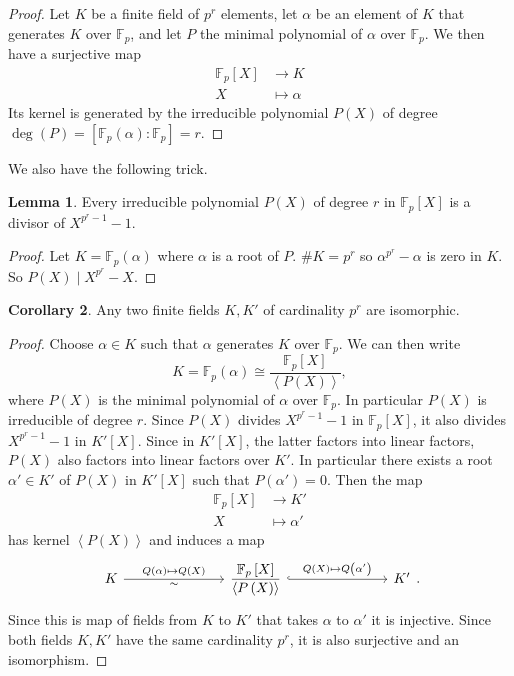 \documentclass{article}
\newcommand{\F}{\mathbb{F}}
\newcommand{\rb}[1]{\left( #1 \right)}
\renewcommand{\sb}[1]{\left[ #1 \right]}
\newcommand{\ab}[1]{\left\langle #1 \right\rangle}
\theoremstyle{definition}\newtheorem{definition}{Definition}[subsection]
\theoremstyle{definition}\newtheorem{remark}[definition]{Remark}
\theoremstyle{definition}\newtheorem*{example}{Example}
\theoremstyle{definition}\newtheorem*{note}{Note}
\newtheorem{lemma}[definition]{Lemma}
\newtheorem{corollary}[definition]{Corollary}
\begin{document}
\begin{proof}
Let $ K $ be a finite field of $ p^r $ elements, let $ \alpha $ be an element of $ K $ that generates $ K $ over $ \F_p $, and let $ P $ the minimal polynomial of $ \alpha $ over $ \F_p $. We then have a surjective map
\begin{align*}
\F_p\sb{X} & \to K \\
X & \mapsto \alpha
\end{align*}
Its kernel is generated by the irreducible polynomial $ P\rb{X} $ of degree $ \deg\rb{P} = \sb{\F_p\rb{\alpha} : \F_p} = r $.
\end{proof}

We also have the following trick.

\begin{lemma}
Every irreducible polynomial $ P\rb{X} $ of degree $ r $ in $ \F_p\sb{X} $ is a divisor of $ X^{p^r - 1} - 1 $.
\end{lemma}

\begin{proof}
Let $ K = \F_p\rb{\alpha} $ where $ \alpha $ is a root of $ P $. $ \#K = p^r $ so $ \alpha^{p^r} - \alpha $ is zero in $ K $. So $ P\rb{X} \mid X^{p^r} - X $.
\end{proof}

\begin{corollary}
Any two finite fields $ K, K' $ of cardinality $ p^r $ are isomorphic.
\end{corollary}

\begin{proof}
Choose $ \alpha \in K $ such that $ \alpha $ generates $ K $ over $ \F_p $. We can then write
$$ K = \F_p\rb{\alpha} \cong \dfrac{\F_p\sb{X}}{\ab{P\rb{X}}}, $$
where $ P\rb{X} $ is the minimal polynomial of $ \alpha $ over $ \F_p $. In particular $ P\rb{X} $ is irreducible of degree $ r $. Since $ P\rb{X} $ divides $ X^{p^r - 1} - 1 $ in $ \F_p\sb{X} $, it also divides $ X^{p^r - 1} - 1 $ in $ K'\sb{X} $. Since in $ K'\sb{X} $, the latter factors into linear factors, $ P\rb{X} $ also factors into linear factors over $ K' $. In particular there exists a root $ \alpha' \in K' $ of $ P\rb{X} $ in $ K'\sb{X} $ such that $ P\rb{\alpha'} = 0 $. Then the map
\begin{align*}
\F_p\sb{X} & \to K' \\
X & \mapsto \alpha'
\end{align*}
has kernel $ \ab{P\rb{X}} $ and induces a map
$$
\begin{tikzcd}[column sep=1in]
K \arrow{r}{Q\rb{\alpha} \mapsto Q\rb{X}}[swap]{\sim} & \dfrac{\F_p\sb{X}}{\ab{P\rb{X}}} \arrow[hookrightarrow]{r}{Q\rb{X} \mapsto Q\rb{\alpha'}} & K'
\end{tikzcd}.
$$
Since this is map of fields from $ K $ to $ K' $ that takes $ \alpha $ to $ \alpha' $ it is injective. Since both fields $ K, K' $ have the same cardinality $ p^r $, it is also surjective and an isomorphism.
\end{proof}
\end{document}
